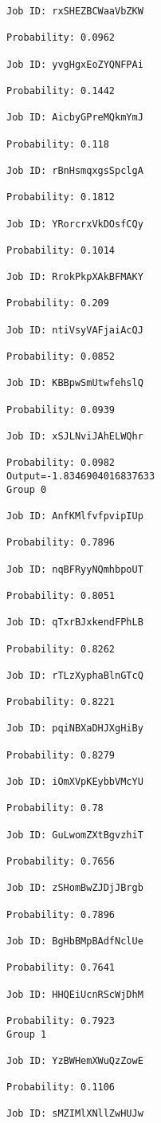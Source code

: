 \documentclass[11pt]{article}
\begin{document}
\begin{Verbatim}[commandchars=\\\{\}]
Job ID: rxSHEZBCWaaVbZKW

Probability: 0.0962

Job ID: yvgHgxEoZYQNFPAi

Probability: 0.1442

Job ID: AicbyGPreMQkmYmJ

Probability: 0.118

Job ID: rBnHsmqxgsSpclgA

Probability: 0.1812

Job ID: YRorcrxVkDOsfCQy

Probability: 0.1014

Job ID: RrokPkpXAkBFMAKY

Probability: 0.209

Job ID: ntiVsyVAFjaiAcQJ

Probability: 0.0852

Job ID: KBBpwSmUtwfehslQ

Probability: 0.0939

Job ID: xSJLNviJAhELWQhr

Probability: 0.0982
Output=-1.8346904016837633
Group 0

Job ID: AnfKMlfvfpvipIUp

Probability: 0.7896

Job ID: nqBFRyyNQmhbpoUT

Probability: 0.8051

Job ID: qTxrBJxkendFPhLB

Probability: 0.8262

Job ID: rTLzXyphaBlnGTcQ

Probability: 0.8221

Job ID: pqiNBXaDHJXgHiBy

Probability: 0.8279

Job ID: iOmXVpKEybbVMcYU

Probability: 0.78

Job ID: GuLwomZXtBgvzhiT

Probability: 0.7656

Job ID: zSHomBwZJDjJBrgb

Probability: 0.7896

Job ID: BgHbBMpBAdfNclUe

Probability: 0.7641

Job ID: HHQEiUcnRScWjDhM

Probability: 0.7923
Group 1

Job ID: YzBWHemXWuQzZowE

Probability: 0.1106

Job ID: sMZIMlXNllZwHUJw


\end{Verbatim}
\end{document}

